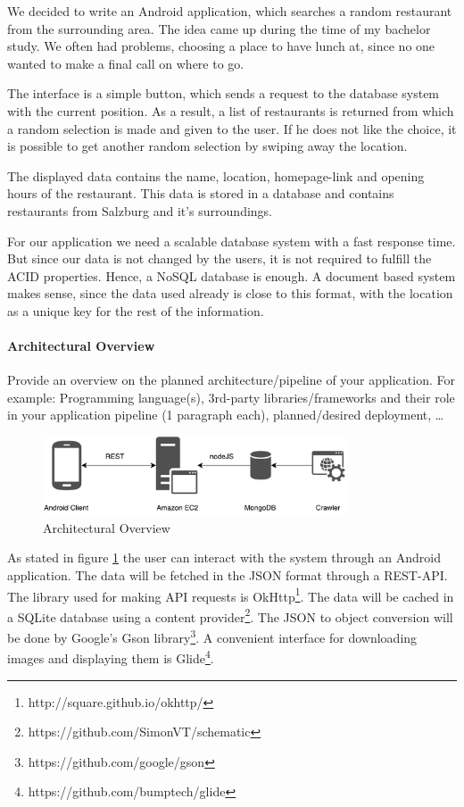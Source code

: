 We decided to write an Android application, which searches a random restaurant from the surrounding area. The idea came up during the time of my bachelor study. We often had problems, choosing a place to have lunch at, since no one wanted to make a final call on where to go.

The interface is a simple button, which sends a request to the database system with the current position. As a result, a list of restaurants is returned from which a random selection is made and given to the user. If he does not like the choice, it is possible to get another random selection by swiping away the location.

The displayed data contains the name, location, homepage-link and opening hours of the restaurant. This data is stored in a database and contains restaurants from Salzburg and it's surroundings. 

For our application we need a scalable database system with a fast response time. But since our data is not changed by the users, it is not required to fulfill the ACID properties. Hence, a NoSQL database is enough. A document based system makes sense, since the data used already is close to this format, with the location as a unique key for the rest of the information.



\paragraph{Architectural Overview}

Provide an overview on the planned architecture/pipeline of your application.
For example: Programming language(s), 3rd-party libraries/frameworks and their
role in your application pipeline (1 paragraph each), planned/desired
deployment, \ldots

\begin{figure}[H]
	\centering
	\includegraphics[width=0.8\textwidth]{img/Arch}
	\caption{Architectural Overview}
	\label{fig:Arch}
\end{figure}

As stated in figure \ref{fig:Arch} the user can interact with the system through an Android application. The data will be fetched in the JSON format through a REST-API. The library used for making API requests is OkHttp\footnote{http://square.github.io/okhttp/}. The data will be cached in a SQLite database using a content provider\footnote{https://github.com/SimonVT/schematic}. The JSON to object conversion will be done by Google's Gson library\footnote{https://github.com/google/gson}. A convenient interface for downloading images and displaying them is Glide\footnote{https://github.com/bumptech/glide}. 


